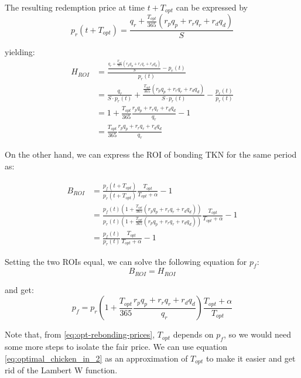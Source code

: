 \documentclass{article}
\begin{document}
The resulting redemption price at time $t + T_{opt}$ can be expressed by
\begin{equation}
  \label{eq:redemption-price}
    p_r(t + T_{opt}) = \frac{q_r + \frac{T_{opt}}{365} (r_p q_p + r_r q_r + r_d q_d)}{S}
\end{equation}

yielding:
\begin{equation}
  \label{eq:ROI-eq2}
  \begin{split}
    H_{ROI} & = \frac{\frac{q_r + \frac{T_{opt}}{365} (r_p q_p + r_r q_r + r_d q_d)}{S} - p_r(t)}{p_r(t)} \\
    & = \frac{q_r}{S \cdot p_r(t)} + \frac{\frac{T_{opt}}{365} (r_p q_p + r_r q_r + r_d q_d)}{S\cdot p_r(t)} - \frac{p_r(t)}{p_r(t)} \\
    & = 1 + \frac{T_{opt}}{365} \frac{r_p q_p + r_r q_r + r_d q_d}{q_r} - 1 \\
    & = \frac{T_{opt}}{365} \frac{r_p q_p + r_r q_r + r_d q_d}{q_r}
  \end{split}
\end{equation}

On the other hand, we can express the ROI of bonding TKN for the same period as:

\begin{equation}
  \label{eq:ROI-bonding}
  \begin{split}
    B_{ROI} & = \frac{p_f(t+T_{opt})}{p_r(t+T_{opt})}\frac{T_{opt}}{T_{opt}+\alpha} - 1 \\
    & = \frac{p_f(t)(1 + \frac{T_{opt}}{365} (r_p q_p + r_r q_r + r_d q_d))} {p_r(t)(1 + \frac{T_{opt}}{365} (r_p q_p + r_r q_r + r_d q_d))}    \frac{T_{opt}}{T_{opt}+\alpha} - 1 \\ 
    & = \frac{p_f(t)}{p_r(t)}\frac{T_{opt}}{T_{opt}+\alpha} - 1
  \end{split}
\end{equation}

Setting the two ROIs equal, we can solve the following equation for $p_f$:
\begin{equation}
  \label{eq:ROI-bonding-holding}
  B_{ROI} = H_{ROI}
\end{equation}

and get:
\begin{equation}
  \label{eq:ROI-bonding-holding-2}
  p_f = p_r\left(1 + \frac{T_{opt}}{365} \frac{r_p q_p + r_r q_r + r_d q_d}{q_r}\right) \frac{T_{opt}+\alpha}{T_{opt}}
\end{equation}

Note that, from \ref{eq:opt-rebonding-prices}, $T_{opt}$ depends on $p_f$, so we would need some more steps to isolate the fair price. We can use equation \ref{eq:optimal_chicken_in_2} as an approximation of $T_{opt}$ to make it easier and get rid of the Lambert W function.
\end{document}
